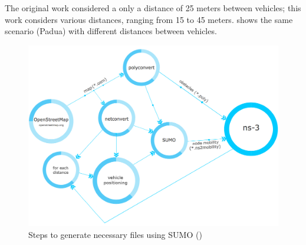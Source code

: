 	The original work considered a only a distance of 25 meters between vehicles; this work considers various distances, ranging from 15 to 45 meters.   shows the same scenario (Padua) with different distances between vehicles.
	
	\begin{figure}[H]
		\centering
		\includegraphics[width=\textwidth]{immagini/sumo-process}
		\caption{Steps to generate necessary files using SUMO (\cite{ROM2017})}
		\label{fig:sumo-process}
	\end{figure}
	

